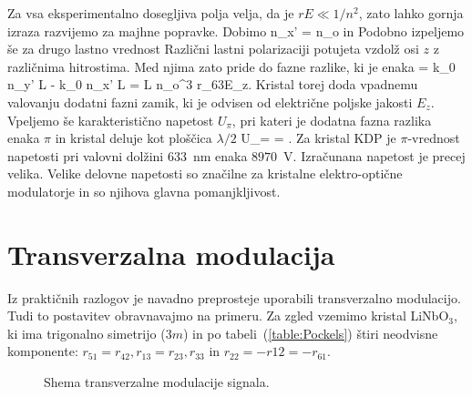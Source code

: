 Za vsa eksperimentalno dosegljiva polja velja, da je $rE\ll1/n^2$, 
zato lahko gornja izraza razvijemo za majhne popravke. Dobimo
\beq
n_{x'} =  \approx n_o 
\eeq
in 
Podobno izpeljemo še za drugo lastno vrednost
Različni lastni polarizaciji potujeta vzdolž osi $z$ z različnima hitrostima. 
Med njima zato pride do fazne razlike, ki je enaka
\beq
\Delta \phi = k_0 n_{y'} L - k_0 n_{x'} L = L 
n_o^3 r_{63}E_z.
\label{phiAM}
\eeq
Kristal torej doda vpadnemu valovanju dodatni fazni zamik, ki je odvisen od električne poljske
jakosti $E_z$. Vpeljemo še karakteristično napetost $U_\pi$, pri kateri je dodatna 
fazna razlika enaka $\pi$ in kristal deluje kot ploščica $\lambda/2$
\beq
U_\pi =  = .
\eeq
Za kristal KDP je $\pi$-vrednost napetosti pri valovni dolžini $633$~nm enaka $8970$~V. 
Izračunana napetost je precej velika. Velike delovne napetosti
so značilne za kristalne elektro-optične modulatorje in so njihova
glavna pomanjkljivost. 

\section{Transverzalna modulacija}
Iz praktičnih razlogov je navadno preprosteje uporabili transverzalno modulacijo.
Tudi to postavitev obravnavajmo na primeru. Za zgled vzemimo kristal LiNbO$_3$, ki 
ima trigonalno simetrijo ($3m$) in po tabeli~(\ref{table:Pockels}) štiri 
neodvisne komponente: $r_{51}=r_{42}, r_{13}=r_{23}, r_{33}$ in $r_{22}=-r{12}=-r_{61}$.
\begin{figure}[h]
\centering
\def\svgwidth{80truemm} 

\caption{Shema transverzalne modulacije signala.}
\label{fig:tmshema}
\end{figure}

